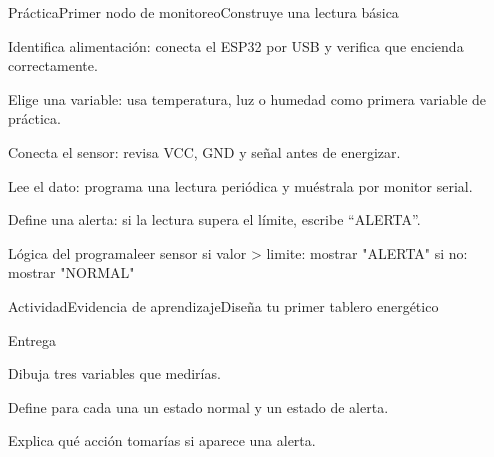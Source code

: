 \documentclass{../plantilla/hvtbook}
\begin{document}
\begin{HVTPage}{Práctica}{Primer nodo de monitoreo}{Construye una lectura básica}
\begin{HVTSteps}\item Identifica alimentación: conecta el ESP32 por USB y verifica que encienda correctamente. \item Elige una variable: usa temperatura, luz o humedad como primera variable de práctica. \item Conecta el sensor: revisa VCC, GND y señal antes de energizar. \item Lee el dato: programa una lectura periódica y muéstrala por monitor serial. \item Define una alerta: si la lectura supera el límite, escribe “ALERTA”.\end{HVTSteps}
\begin{HVTCode}{Lógica del programa}leer sensor
si valor > limite:
    mostrar "ALERTA"
si no:
    mostrar "NORMAL"\end{HVTCode}
\end{HVTPage}
\begin{HVTPage}{Actividad}{Evidencia de aprendizaje}{Diseña tu primer tablero energético}
\begin{HVTTask}{Entrega}\item Dibuja tres variables que medirías. \item Define para cada una un estado normal y un estado de alerta. \item Explica qué acción tomarías si aparece una alerta.\end{HVTTask}
\end{HVTPage}
\end{document}
